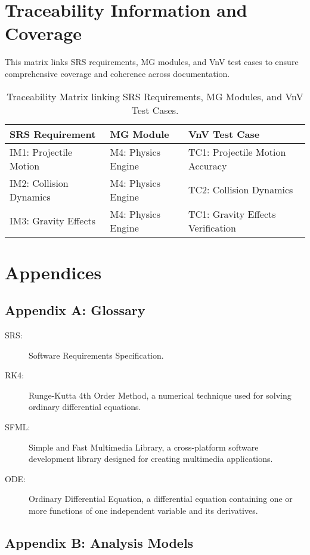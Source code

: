 \documentclass[12pt]{article}
\begin{document}
\section{Traceability Information and Coverage }
This matrix links SRS requirements, MG modules, and VnV test cases to ensure comprehensive coverage and coherence across documentation.

\begin{table}[H]
\centering
\begin{tabular}{|l|l|l|}
\hline
\textbf{SRS Requirement} & \textbf{MG Module} & \textbf{VnV Test Case} \\
\hline
IM1: Projectile Motion & M4: Physics Engine & TC1: Projectile Motion Accuracy \\
IM2: Collision Dynamics & M4: Physics Engine & TC2: Collision Dynamics \\
IM3: Gravity Effects & M4: Physics Engine & TC1: Gravity Effects Verification \\
\hline
\end{tabular}
\caption{Traceability Matrix linking SRS Requirements, MG Modules, and VnV Test Cases.}
\end{table}


\section{Appendices}
\subsection{Appendix A: Glossary}
\begin{description}
    \item[SRS:] Software Requirements Specification.
    \item[RK4:] Runge-Kutta 4th Order Method, a numerical technique used for solving ordinary differential equations.
    \item[SFML:] Simple and Fast Multimedia Library, a cross-platform software development library designed for creating multimedia applications.
    \item[ODE:] Ordinary Differential Equation, a differential equation containing one or more functions of one independent variable and its derivatives.
\end{description}

\subsection{Appendix B: Analysis Models}
\end{document}
